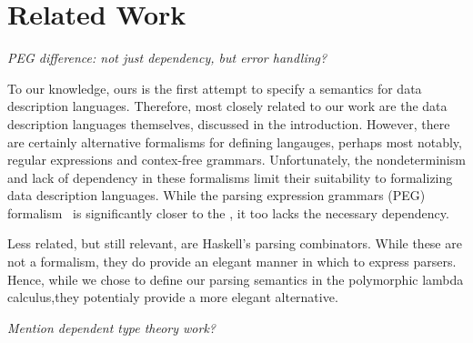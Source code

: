 \section{Related Work}
\label{sec:related}

{\em PEG difference: not just dependency, but error handling?}

To our knowledge, ours is the first attempt to specify a semantics for
data description languages. Therefore, most closely related to our
work are the data description languages themselves, discussed in the
introduction.  However, there are certainly alternative formalisms for
defining langauges, perhaps most notably, regular expressions and
contex-free grammars. Unfortunately, the nondeterminism and lack of
dependency in these formalisms limit their suitability to formalizing
data description languages. While the parsing expression grammars
(PEG) formalism~\cite{ford:parsing-expression-grammars} is
significantly closer to the \ddc{}, it too lacks the necessary
dependency.

Less related, but still relevant, are Haskell's parsing
combinators. While these are not a formalism, they do provide an
elegant manner in which to express parsers. Hence, while we chose to
define our parsing semantics in the polymorphic lambda calculus,they
potentialy provide a more elegant alternative.

{\em Mention dependent type theory work?}
